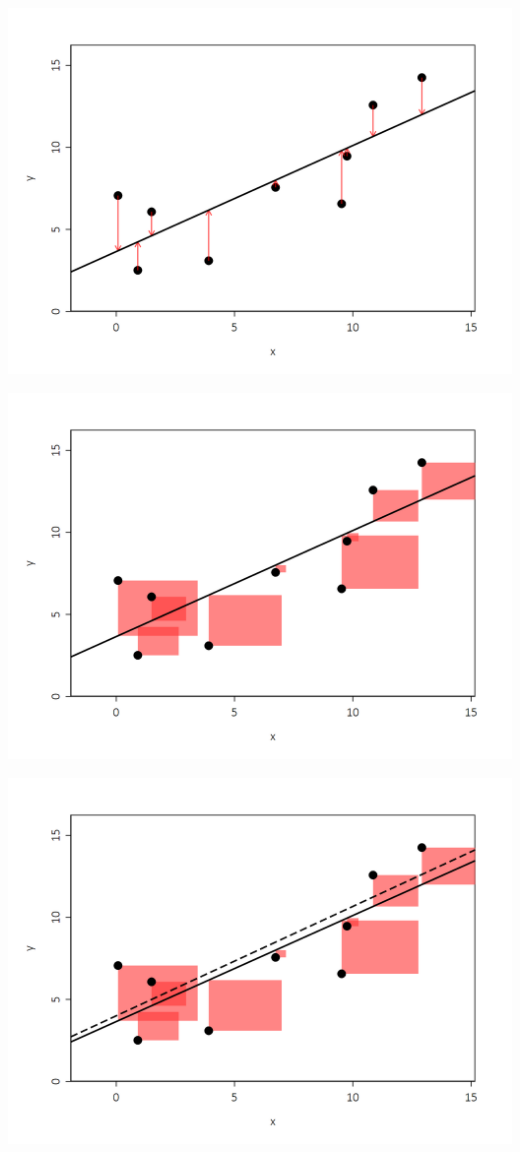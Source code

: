 \documentclass[a4paper,12pt]{article}
\begin{document}
    \begin{center}
\includegraphics[width=.9\textwidth]{figures/OLS3}
     \end{center}



    \begin{center}
\includegraphics[width=.9\textwidth]{figures/OLS4}
     \end{center}




    \begin{center}
\includegraphics[width=.9\textwidth]{figures/OLS5}
     \end{center}
\end{document}
